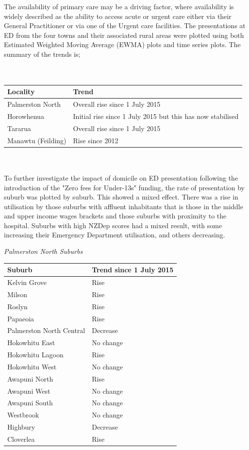 \documentclass[11pt,a4paper]{article}
\begin{document}
The availability of primary care may be a driving factor, where availability is widely described as the ability to access acute or urgent care either via their General Practitioner or via one of the Urgent care facilities. The presentations at ED from the four towns and their associated rural areas were plotted using both Estimated Weighted Moving Average (EWMA) plots and time series plots. The summary of the trends is;\\ 
\\
\\
\begin{tabular}{|l|l|}
\hline 
        Locality & Trend\\
\hline
        Palmerston North & Overall rise since 1 July 2015\\
\hline
        Horowhenua & Initial rise since  1 July 2015 but this has now stabilised\\
\hline
        Tararua & Overall rise since 1 July 2015\\
\hline
        Manawtu (Feilding) & Rise since 2012\\
\hline
\end{tabular}
\\
\\
To further investigate the impact of domicile on ED presentation following the introduction of the "Zero fees for Under-13s" funding, the rate of presentation by suburb was plotted by suburb. This showed a mixed effect. There was a rise in utilisation by those suburbs with affluent inhabitants that is those in the middle and upper income wages brackets and those suburbs with proximity to the hospital. Suburbs with high NZDep scores had a mixed result, with some increasing their Emergency Department utilisation, and others decreasing.
\pagebreak


\emph{Palmerston North Suburbs}


\begin{tabular}{|l|l|}
\hline
        Suburb & Trend since 1 July 2015\\
\hline
        Kelvin Grove & Rise\\
\hline
        Milson & Rise\\
\hline
        Roslyn & Rise\\
\hline
        Papaeoia & Rise\\
\hline
        Palmerston North Central & Decrease\\
\hline
        Hokowhitu East & No change\\
\hline
        Hokowhitu Lagoon & Rise\\
\hline
        Hokowhitu West & No change\\
\hline
        Awapuni North & Rise\\
\hline
        Awapuni West & No change\\
\hline
        Awapuni South & No change\\
\hline
        Westbrook & No change\\
\hline
        Highbury & Decrease\\
\hline
        Cloverlea & Rise\\
\hline
\end{tabular}
\\
\\
\end{document}
